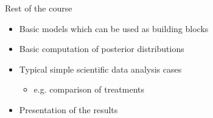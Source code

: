 \documentclass[10pt]{beamer}
\begin{document}
%

\begin{frame}{Rest of the course}

  \begin{itemize}
  \item Basic models which can be used as building blocks
    \vspace{\baselineskip}
  \item Basic computation of posterior distributions
    \vspace{\baselineskip}
  \item Typical simple scientific data analysis cases
     \begin{itemize}
     \item e.g. comparison of treatments
     \end{itemize}
    \vspace{\baselineskip}
  \item Presentation of the results
  \end{itemize}
\end{frame}

%
\end{document}
